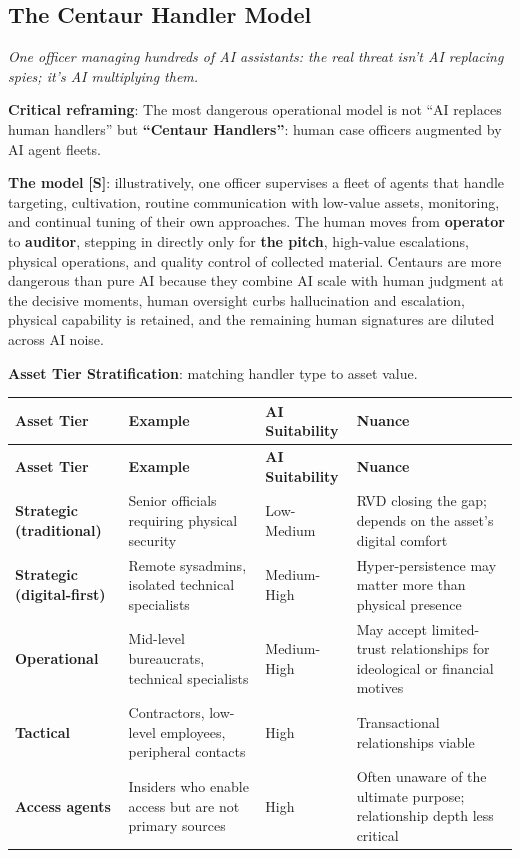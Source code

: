 \documentclass[11pt,letterpaper]{article}
\newcommand{\etraneed}[1]{\par\ifdim\pagegoal<\maxdimen\ifdim\pagetotal<\pagegoal\ifdim\dimexpr\pagegoal-\pagetotal\relax<\dimexpr#1\relax\newpage\fi\fi\fi}
\begin{document}
\subsection{The Centaur Handler Model}

\textit{One officer managing hundreds of AI assistants: the real threat isn't AI replacing spies; it's AI multiplying them.}

\textbf{Critical reframing}: The most dangerous operational model is not ``AI replaces human handlers'' but \textbf{``Centaur Handlers''}: human case officers augmented by AI agent fleets.

\textbf{The model} \textbf{[S]}: illustratively, one officer supervises a fleet of agents that handle targeting, cultivation, routine communication with low-value assets, monitoring, and continual tuning of their own approaches. The human moves from \textbf{operator} to \textbf{auditor}, stepping in directly only for \textbf{the pitch}, high-value escalations, physical operations, and quality control of collected material. Centaurs are more dangerous than pure AI because they combine AI scale with human judgment at the decisive moments, human oversight curbs hallucination and escalation, physical capability is retained, and the remaining human signatures are diluted across AI noise.

\vspace{0.5cm}
\etraneed{11\baselineskip}
\textbf{Asset Tier Stratification}: matching handler type to asset value.

{\small
\begin{longtable}{L{3cm}L{3.9cm}L{2cm}L{6.2cm}}
\toprule
\textbf{Asset Tier} & \textbf{Example} & \textbf{AI Suitability} & \textbf{Nuance} \\
\midrule
\endfirsthead
\toprule
\textbf{Asset Tier} & \textbf{Example} & \textbf{AI Suitability} & \textbf{Nuance} \\
\midrule
\endhead
\textbf{Strategic (traditional)} & Senior officials requiring physical security & Low-Medium & RVD closing the gap; depends on the asset's digital comfort \\*
\textbf{Strategic (digital-first)} & Remote sysadmins, isolated technical specialists & Medium-High & Hyper-persistence may matter more than physical presence \\
\textbf{Operational} & Mid-level bureaucrats, technical specialists & Medium-High & May accept limited-trust relationships for ideological or financial motives \\
\textbf{Tactical} & Contractors, low-level employees, peripheral contacts & High & Transactional relationships viable \\*
\textbf{Access agents} & Insiders who enable access but are not primary sources & High & Often unaware of the ultimate purpose; relationship depth less critical \\
\bottomrule
\end{longtable}}
\end{document}
